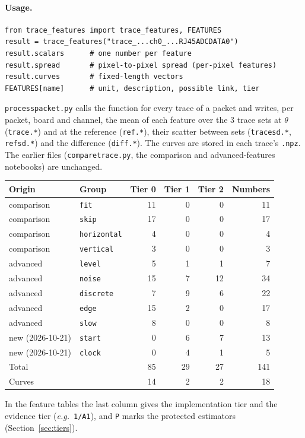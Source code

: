 \documentclass[10pt]{article}
\newcommand{\code}[1]{\texttt{#1}}
\renewcommand{\_}{\oldunderscore\allowbreak}
\begin{document}
\paragraph{Usage.}
\begin{verbatim}
from trace_features import trace_features, FEATURES
result = trace_features("trace_...ch0_...RJ45ADCDATA0")
result.scalars      # one number per feature
result.spread       # pixel-to-pixel spread (per-pixel features)
result.curves       # fixed-length vectors
FEATURES[name]      # unit, description, possible link, tier
\end{verbatim}
\code{process\_packet.py} calls the function for every trace of a packet and writes, per packet, board and channel, the mean
of each feature over the 3 trace sets at $\theta$ (\code{trace.*}) and at the reference (\code{ref.*}), their scatter between sets
(\code{trace\_sd.*}, \code{ref\_sd.*}) and the difference (\code{diff.*}). The curves are stored in each trace's \code{.npz}.
The earlier files (\code{compare\_trace.py}, the comparison and advanced-features notebooks) are unchanged.

\begin{center}
\begin{tabular}{llrrrr}
\toprule
Origin & Group & Tier 0 & Tier 1 & Tier 2 & Numbers \\
\midrule
comparison & \code{fit} & 11 & 0 & 0 & 11 \\
comparison & \code{skip} & 17 & 0 & 0 & 17 \\
comparison & \code{horizontal} & 4 & 0 & 0 & 4 \\
comparison & \code{vertical} & 3 & 0 & 0 & 3 \\
advanced & \code{level} & 5 & 1 & 1 & 7 \\
advanced & \code{noise} & 15 & 7 & 12 & 34 \\
advanced & \code{discrete} & 7 & 9 & 6 & 22 \\
advanced & \code{edge} & 15 & 2 & 0 & 17 \\
advanced & \code{slow} & 8 & 0 & 0 & 8 \\
new (2026-10-21) & \code{start} & 0 & 6 & 7 & 13 \\
new (2026-10-21) & \code{clock} & 0 & 4 & 1 & 5 \\
\midrule
Total & & 85 & 29 & 27 & 141 \\
Curves & & 14 & 2 & 2 & 18 \\
\bottomrule
\end{tabular}
\end{center}
In the feature tables the last column gives the implementation tier and the evidence tier (\emph{e.g.}\ \code{1/A1}), and
\code{P} marks the protected estimators (Section~\ref{sec:tiers}).
\end{document}
